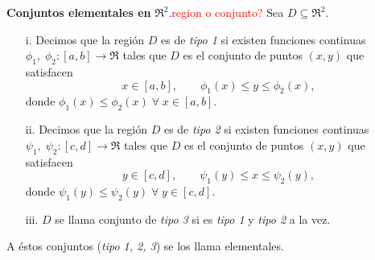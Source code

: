 \begin{definition}\textbf{Conjuntos elementales en }$\Re^2$.\textcolor{red}{region o conjunto?}
    Sea $D\subseteq\Re^2$.
    \begin{enumerate}
    \item[i.]
    Decimos que la regi\'on $D$ es de \textit{tipo 1} si existen funciones continuas $\phi_1,\;\phi_2:[a,b]\to\Re$ tales que $D$ es el conjunto de puntos $(x,y)$ que satisfacen
    \[
        x\in[a,b], \qquad \phi_1(x)\leq y\leq\phi_2(x),  
    \]%
    donde $\phi_1(x)\leq\phi_2(x)\;\forall\;x\in[a,b].$
    \item[ii.]
    Decimos que la regi\'on $D$ es de \textit{tipo 2} si existen funciones continuas $\psi_1,\;\psi_2:[c,d]\to\Re$ tales que $D$ es el conjunto de puntos $(x,y)$ que satisfacen
    \[
        y\in[c,d], \qquad \psi_1(y)\leq x\leq\psi_2(y),  
    \]
    donde $\psi_1(y)\leq\psi_2(y)\;\forall\;y\in[c,d].$
    \item[iii.]
    $D$ se llama conjunto de \textit{tipo 3} si es \textit{tipo 1} y \textit{tipo 2} a la vez.
    \end{enumerate}
    A \'estos conjuntos (\textit{tipo 1, 2, 3}) se los llama elementales.\final
\end{definition}

